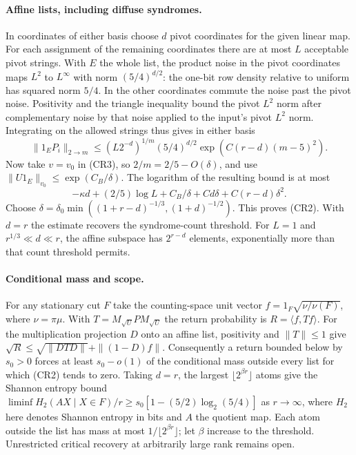 \paragraph{Affine lists, including diffuse syndromes.}
In coordinates of either basis choose $d$ pivot coordinates for the given linear map. For each assignment of the remaining coordinates there are at most $L$ acceptable pivot strings. With $E$ the whole list, the product noise in the pivot coordinates maps $L^2$ to $L^\infty$ with norm $(5/4)^{d/2}$: the one-bit row density relative to uniform has squared norm $5/4$. In the other coordinates commute the noise past the pivot noise. Positivity and the triangle inequality bound the pivot $L^2$ norm after complementary noise by that noise applied to the input's pivot $L^2$ norm. Integrating on the allowed strings thus gives in either basis
\[
 \|1_EP_i\|_{2\to m}
 \le (L2^{-d})^{1/m}(5/4)^{d/2}\exp(C(r-d)(m-5)^2).
\]
Now take $v=v_0$ in (CR3), so $2/m=2/5-O(\delta)$, and use $\|U1_E\|_{v_0}\le \exp(C_B/\delta)$. The logarithm of the resulting bound is at most
\[
 -\kappa d+(2/5)\log L+C_B/\delta+C d\delta+C(r-d)\delta^2 .
\]
Choose $\delta=\delta_0\min((1+r-d)^{-1/3},(1+d)^{-1/2})$. This proves (CR2). With $d=r$ the estimate recovers the syndrome-count threshold. For $L=1$ and $r^{1/3}\ll d\ll r$, the affine subspace has $2^{r-d}$ elements, exponentially more than that count threshold permits.

\paragraph{Conditional mass and scope.}
For any stationary cut $F$ take the counting-space unit vector $f=1_F\sqrt{\nu/\nu(F)}$, where $\nu=\pi\mu$. With $T=M_{\sqrt U}P M_{\sqrt U}$ the return probability is $R=\langle f,Tf\rangle$. For the multiplication projection $D$ onto an affine list, positivity and $\|T\|\le1$ give $\sqrt R\le\sqrt{\|DTD\|}+\|(1-D)f\|$. Consequently a return bounded below by $s_0>0$ forces at least $s_0-o(1)$ of the conditional mass outside every list for which (CR2) tends to zero. Taking $d=r$, the largest $\lfloor 2^{\beta r}\rfloor$ atoms give the Shannon entropy bound $\liminf H_2(A X\mid X\in F)/r\ge s_0[1-(5/2)\log_2(5/4)]$ as $r\to\infty$, where $H_2$ here denotes Shannon entropy in bits and $A$ the quotient map. Each atom outside the list has mass at most $1/\lfloor 2^{\beta r}\rfloor$; let $\beta$ increase to the threshold. Unrestricted critical recovery at arbitrarily large rank remains open.

